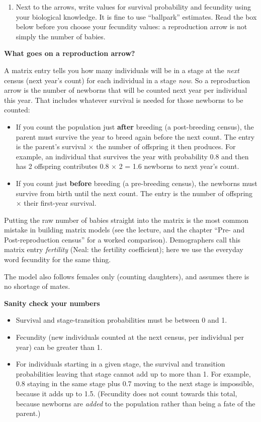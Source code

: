 \documentclass[
  a4paper]{book}
\providecommand{\tightlist}{%
  \setlength{\itemsep}{0pt}\setlength{\parskip}{0pt}}
\begin{document}
\begin{enumerate}
\def\labelenumi{\arabic{enumi})}
\setcounter{enumi}{2}
\tightlist
\item
  Next to the arrows, write values for survival probability and fecundity using your biological knowledge. It is fine to use ``ballpark'' estimates. Read the box below before you choose your fecundity values: a reproduction arrow is not simply the number of babies.
\end{enumerate}

\textbf{What goes on a reproduction arrow?}

A matrix entry tells you how many individuals will be in a stage at the \emph{next} census (next year's count) for each individual in a stage \emph{now}. So a reproduction arrow is the number of newborns that will be counted next year per individual this year. That includes whatever survival is needed for those newborns to be counted:

\begin{itemize}
\tightlist
\item
  If you count the population just \textbf{after} breeding (a post-breeding census), the parent must survive the year to breed again before the next count. The entry is the parent's survival × the number of offspring it then produces. For example, an individual that survives the year with probability 0.8 and then has 2 offspring contributes 0.8 × 2 = 1.6 newborns to next year's count.
\item
  If you count just \textbf{before} breeding (a pre-breeding census), the newborns must survive from birth until the next count. The entry is the number of offspring × their first-year survival.
\end{itemize}

Putting the raw number of babies straight into the matrix is the most common mistake in building matrix models (see the lecture, and the chapter ``Pre- and Post-reproduction census'' for a worked comparison). Demographers call this matrix entry \emph{fertility} (Neal: the fertility coefficient); here we use the everyday word fecundity for the same thing.

The model also follows females only (counting daughters), and assumes there is no shortage of mates.

\textbf{Sanity check your numbers}

\begin{itemize}
\tightlist
\item
  Survival and stage-transition probabilities must be between 0 and 1.
\item
  Fecundity (new individuals counted at the next census, per individual per year) can be greater than 1.
\item
  For individuals starting in a given stage, the survival and transition probabilities leaving that stage cannot add up to more than 1. For example, 0.8 staying in the same stage plus 0.7 moving to the next stage is impossible, because it adds up to 1.5. (Fecundity does not count towards this total, because newborns are \emph{added} to the population rather than being a fate of the parent.)
\end{itemize}
\end{document}
